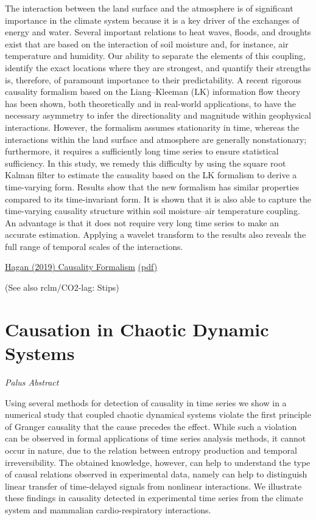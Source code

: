 \documentclass[
]{book}
\begin{document}
The interaction between the land surface and the atmosphere is of significant importance in the climate system because it is a key driver of the exchanges of energy and water. Several important relations to heat waves, floods, and droughts exist that are based on the interaction of soil moisture and, for instance, air temperature and humidity. Our ability to separate the elements of this coupling, identify the exact locations where they are strongest, and quantify their strengths is, therefore, of paramount importance to their predictability. A recent rigorous causality formalism based on the Liang--Kleeman (LK) information flow theory has been shown, both theoretically and in real-world applications, to have the necessary asymmetry to infer the directionality and magnitude within geophysical interactions. However, the formalism assumes stationarity in time, whereas the interactions within the land surface and atmosphere are generally nonstationary; furthermore, it requires a sufficiently long time series to ensure statistical sufficiency. In this study, we remedy this difficulty by using the square root Kalman filter to estimate the causality based on the LK formalism to derive a time-varying form. Results show that the new formalism has similar properties compared to its time-invariant form. It is shown that it is also able to capture the time-varying causality structure within soil moisture--air temperature coupling. An advantage is that it does not require very long time series to make an accurate estimation. Applying a wavelet transform to the results also reveals the full range of temporal scales of the interactions.

\href{https://journals.ametsoc.org/view/journals/clim/32/21/jcli-d-18-0881.1.xml}{Hagan (2019) Causality Formalism}
\href{pdf/Hagan_2019_Causality_Formalism.pdf}{(pdf)}

(See also rclm/CO2-lag: Stips)

\hypertarget{causation-in-chaotic-dynamic-systems}{%
\section{Causation in Chaotic Dynamic Systems}\label{causation-in-chaotic-dynamic-systems}}

\emph{Palus Abstract}

Using several methods for detection of causality in time series we show in a numerical study that coupled
chaotic dynamical systems violate the first principle of Granger causality that the cause precedes the effect.
While such a violation can be observed in formal applications of time series analysis methods, it cannot occur in
nature, due to the relation between entropy production and temporal irreversibility. The obtained knowledge,
however, can help to understand the type of causal relations observed in experimental data, namely can help
to distinguish linear transfer of time-delayed signals from nonlinear interactions. We illustrate these findings
in causality detected in experimental time series from the climate system and mammalian cardio-respiratory
interactions.
\end{document}
